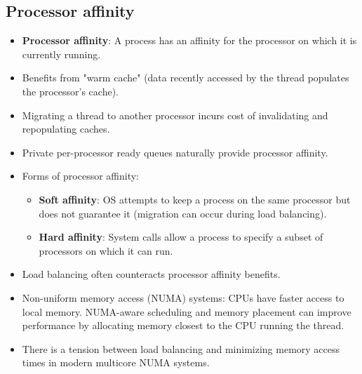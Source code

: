 \subsection{Processor affinity}
\begin{itemize}
    \item \textbf{Processor affinity}: A process has an affinity for the processor on which it is currently running.
    \item Benefits from "warm cache" (data recently accessed by the thread populates the processor's cache).
    \item Migrating a thread to another processor incurs cost of invalidating and repopulating caches.
    \item Private per-processor ready queues naturally provide processor affinity.
    \item Forms of processor affinity:
        \begin{itemize}
            \item \textbf{Soft affinity}: OS attempts to keep a process on the same processor but does not guarantee it (migration can occur during load balancing).
            \item \textbf{Hard affinity}: System calls allow a process to specify a subset of processors on which it can run.
        \end{itemize}
    \item Load balancing often counteracts processor affinity benefits.
    \item Non-uniform memory access (NUMA) systems: CPUs have faster access to local memory. NUMA-aware scheduling and memory placement can improve performance by allocating memory closest to the CPU running the thread.
    \item There is a tension between load balancing and minimizing memory access times in modern multicore NUMA systems.
\end{itemize}

